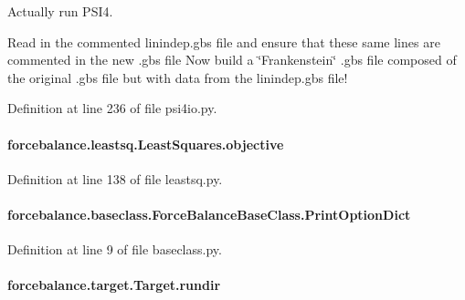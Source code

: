 Actually run P\-S\-I4. 

Read in the commented linindep.\-gbs file and ensure that these same lines are commented in the new .gbs file Now build a \char`\"{}\-Frankenstein\char`\"{} .gbs file composed of the original .gbs file but with data from the linindep.\-gbs file! 

Definition at line 236 of file psi4io.\-py.

\hypertarget{classforcebalance_1_1leastsq_1_1LeastSquares_a169fd8ca94e8f36539ec4ccfa0af4902}{
\paragraph[{objective}]{\setlength{\rightskip}{0pt plus 5cm}forcebalance.\-leastsq.\-Least\-Squares.\-objective\hspace{0.3cm}{\ttfamily [inherited]}}}\label{classforcebalance_1_1leastsq_1_1LeastSquares_a169fd8ca94e8f36539ec4ccfa0af4902}


Definition at line 138 of file leastsq.\-py.

\hypertarget{classforcebalance_1_1baseclass_1_1ForceBalanceBaseClass_a5c55e661e746d1a4443f4e0bc34ebe05}{
\paragraph[{Print\-Option\-Dict}]{\setlength{\rightskip}{0pt plus 5cm}forcebalance.\-baseclass.\-Force\-Balance\-Base\-Class.\-Print\-Option\-Dict\hspace{0.3cm}{\ttfamily [inherited]}}}\label{classforcebalance_1_1baseclass_1_1ForceBalanceBaseClass_a5c55e661e746d1a4443f4e0bc34ebe05}


Definition at line 9 of file baseclass.\-py.

\hypertarget{classforcebalance_1_1target_1_1Target_a6872de5b2d4273b82336ea5b0da29c9e}{
\paragraph[{rundir}]{\setlength{\rightskip}{0pt plus 5cm}forcebalance.\-target.\-Target.\-rundir\hspace{0.3cm}{\ttfamily [inherited]}}}\label{classforcebalance_1_1target_1_1Target_a6872de5b2d4273b82336ea5b0da29c9e}


